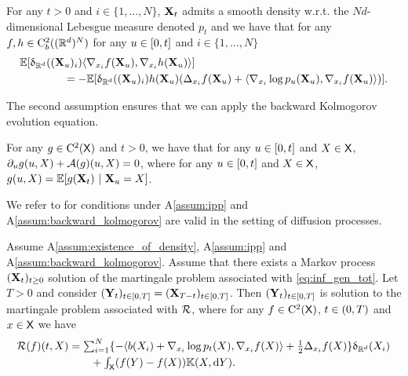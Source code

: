 \begin{assumption}
  \label{assum:ipp}
  For any $t > 0$ and $i \in \{1, \dots, N\}$, $\mathbf{X}_t$ admits a smooth
  density w.r.t. the $Nd$-dimensional Lebesgue measure denoted $p_t$ and we have that for any
  $f, h \in \mathrm{C}_b^2((\mathbb{R}^d)^N)$
for any $u \in [ 0,t ]$ and $i \in \{1, \dots, N\}$
    \begin{align}
      &\mathbb{E}[\updelta_{\mathbb{R}^d}((\mathbf{X}_u)_i) \langle \nabla_{x_i} f(\mathbf{X}_u), \nabla_{x_i} h( \mathbf{X}_u) \rangle] \\
      & \qquad \qquad = -  \mathbb{E}[\updelta_{\mathbb{R}^d}((\mathbf{X}_u)_i) h(\mathbf{X}_u) (\Delta_{x_i} f(\mathbf{X}_u) + \langle \nabla_{x_i} \log p_u(\mathbf{X}_u), \nabla_{x_i} f(\mathbf{X}_u) \rangle)] .
    \end{align}  
\end{assumption}

The second assumption ensures that we can apply the backward Kolmogorov
evolution equation.

\begin{assumption}
  \label{assum:backward_kolmogorov}
  For any $g \in \mathrm{C}^2(\mathsf{X})$ and $t > 0$, we have that for any $u \in [ 0,t ]$ and
  $X \in \mathsf{X}$, $\partial_u g(u,X) + {\mathcal{A}}(g)(u,X) = 0$, where for any
  $u \in [ 0,t ]$ and $X \in \mathsf{X}$,
  $g(u,X) = \mathbb{E}[g(\mathbf{X}_t) \ | \ \mathbf{X}_u=X]$.
\end{assumption}

We refer to \cite{haussmann1986time} for conditions under A\ref{assum:ipp} and
A\ref{assum:backward_kolmogorov} are valid in the setting of diffusion processes.

  \begin{proposition}
    \label{prop:time_reversal_kill}
    Assume \textup{A\ref{assum:existence_of_density}}, \textup{A\ref{assum:ipp}}
    and \textup{A\ref{assum:backward_kolmogorov}}. Assume that there exists a
    Markov process $(\mathbf{X}_t)_{t \geq 0}$ solution of the martingale problem
    associated with \eqref{eq:inf_gen_tot}. Let $T > 0$ and consider
    $(\mathbf{Y}_t)_{t \in [ 0,T ]} = (\mathbf{X}_{T-t})_{t \in [ 0,T ]}$. Then
    $(\mathbf{Y}_t)_{t \in [ 0,T ]}$ is solution to the martingale problem
    associated with $\mathcal{R}$, where for any $f \in \mathrm{C}^2(\mathsf{X})$,
    $t \in ( 0,T )$ and $x \in \mathsf{X}$ we have
\begin{align}
  \label{eq:inf_gen_tot_rev}
  \mathcal{R}(f)(t, X) &\textstyle= \sum_{i=1}^N \{ -\langle b(X_i)+\nabla_{x_i} \log p_t(X), \nabla_{x_i}f(X) \rangle + \tfrac{1}{2} \Delta_{x_i}f(X)\} \updelta_{\mathbb{R}^d}(X_i) \\
  & \qquad  \textstyle + \int_{\mathsf{X}}(f(Y) - f(X))\mathbb{K}(X, \mathrm{d} Y) .
\end{align}
  \end{proposition}

